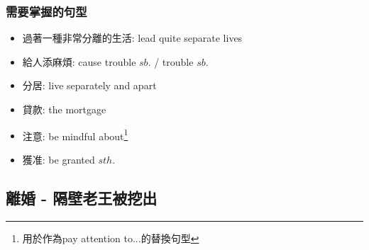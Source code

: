 \subsubsection*{需要掌握的句型}
\begin{multicols}{2}
\begin{itemize}
  \itemsep0em
  \item 過著一種非常分離的生活: lead quite separate lives
  \item 給人添麻煩: cause trouble  $sb.$ / trouble $sb.$
  \item 分居: live separately and apart
  \item {}貸款:  the mortgage
  \item 注意: be mindful about\footnote{用於作為pay attention to...的替換句型}
  \item 獲准: be granted $sth.$
\end{itemize}
\end{multicols}

\subsection{離婚 - 隔壁老王被挖出}
